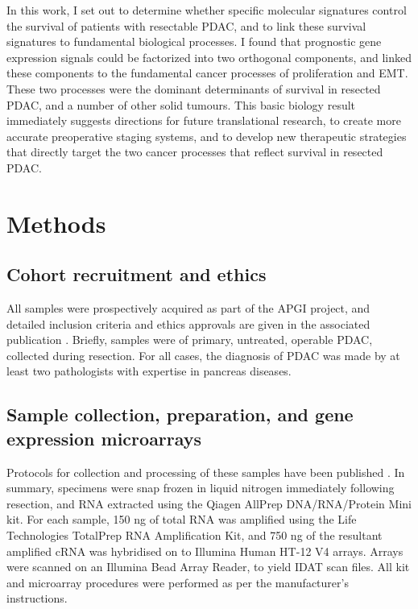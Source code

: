 \documentclass[dissertation.tex]{subfiles}
\begin{document}
In this work, I set out to determine whether specific molecular signatures control the survival of patients with resectable \gls{PDAC}, and to link these survival signatures to fundamental biological processes.  I found that prognostic gene expression signals could be factorized into two orthogonal components, and linked these components to the fundamental cancer processes of proliferation and \gls{EMT}.  These two processes were the dominant determinants of survival in resected \gls{PDAC}, and a number of other solid tumours.  This basic biology result immediately suggests directions for future translational research, to create more accurate preoperative staging systems, and to develop new therapeutic strategies that directly target the two cancer processes that reflect survival in resected \gls{PDAC}.

\section{Methods}
\subsection{Cohort recruitment and ethics}
All samples were prospectively acquired as part of the \gls{APGI} project, and detailed inclusion criteria and ethics approvals are given in the associated publication \cite{Biankin2012}.  Briefly, samples were of primary, untreated, operable \gls{PDAC}, collected during resection.  For all cases, the diagnosis of \gls{PDAC} was made by at least two pathologists with expertise in pancreas diseases.

\subsection{Sample collection, preparation, and gene expression microarrays}
Protocols for collection and processing of these samples have been published \cite{Biankin2012}.  In summary, specimens were snap frozen in liquid nitrogen immediately following resection, and RNA extracted using the Qiagen AllPrep DNA/RNA/Protein Mini kit.  For each sample, 150 ng of total RNA was amplified using the Life Technologies TotalPrep RNA Amplification Kit, and 750 ng of the resultant amplified cRNA was hybridised on to Illumina Human HT-12 V4 arrays.  Arrays were scanned on an Illumina Bead Array Reader, to yield \gls{IDAT} scan files.  All kit and microarray procedures were performed as per the manufacturer's instructions.
\end{document}
